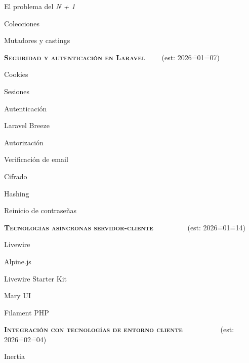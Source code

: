 \begin{longenum}
\begin{longenum}
\begin{longenum}
\begin{longenum}
\begin{longenum}
                    \item El problema del \textit{N + 1}
                \end{longenum}
            \end{longenum}
            \item Colecciones
            \item Mutadores y castings
        \end{longenum}
    \end{longenum}
    \item \textbf{\textsc{Seguridad y autenticación en Laravel}} \ \ \ \ (est: 2026\==01\==07)
    \begin{longenum}
        \item Cookies
        \item Sesiones
        \item Autenticación
        \begin{longenum}
            \item Laravel Breeze
        \end{longenum}
        \item Autorización
        \item Verificación de email
        \item Cifrado
        \item Hashing
        \item Reinicio de contraseñas
    \end{longenum}
    \item \textbf{\textsc{Tecnologías asíncronas servidor-cliente}} \ \ \ \ \ \ \ \ \ (est: 2026\==01\==14)
    \begin{longenum}
        \item Livewire
        \begin{longenum}
            \item Alpine.js
            \item Livewire Starter Kit
            \item Mary UI
        \end{longenum}
        \item Filament PHP
    \end{longenum}
    \item \textbf{\textsc{Integración con tecnologías de entorno cliente}} \ \ \ \ \ \ \ \dual\ \ \ (est: 2026\==02\==04)
    \begin{longenum}
        \item Inertia

\end{longenum}
\end{longenum}
